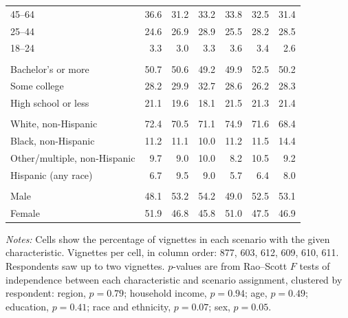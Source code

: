 \begin{table}[H]
\begin{threeparttable}
\begin{tabular}[t]{lrrrrrr}
\hspace{1em}45--64 & 36.6 & 31.2 & 33.2 & 33.8 & 32.5 & 31.4\\
\hspace{1em}25--44 & 24.6 & 26.9 & 28.9 & 25.5 & 28.2 & 28.5\\
\hspace{1em}18--24 & 3.3 & 3.0 & 3.3 & 3.6 & 3.4 & 2.6\\
\addlinespace[0.3em]
\multicolumn{7}{l}{\textit{Education}}\\
\hspace{1em}Bachelor's or more & 50.7 & 50.6 & 49.2 & 49.9 & 52.5 & 50.2\\
\hspace{1em}Some college & 28.2 & 29.9 & 32.7 & 28.6 & 26.2 & 28.3\\
\hspace{1em}High school or less & 21.1 & 19.6 & 18.1 & 21.5 & 21.3 & 21.4\\
\addlinespace[0.3em]
\multicolumn{7}{l}{\textit{Race and ethnicity}}\\
\hspace{1em}White{,} non-Hispanic & 72.4 & 70.5 & 71.1 & 74.9 & 71.6 & 68.4\\
\hspace{1em}Black{,} non-Hispanic & 11.2 & 11.1 & 10.0 & 11.2 & 11.5 & 14.4\\
\hspace{1em}Other/multiple{,} non-Hispanic & 9.7 & 9.0 & 10.0 & 8.2 & 10.5 & 9.2\\
\hspace{1em}Hispanic (any race) & 6.7 & 9.5 & 9.0 & 5.7 & 6.4 & 8.0\\
\addlinespace[0.3em]
\multicolumn{7}{l}{\textit{Sex}}\\
\hspace{1em}Male & 48.1 & 53.2 & 54.2 & 49.0 & 52.5 & 53.1\\
\hspace{1em}Female & 51.9 & 46.8 & 45.8 & 51.0 & 47.5 & 46.9\\
\bottomrule
\end{tabular}
\begin{tablenotes}[flushleft]
\footnotesize
\item \textit{Notes:} Cells show the percentage of vignettes in each scenario with the given characteristic. Vignettes per cell, in column order: 877, 603, 612, 609, 610, 611. Respondents saw up to two vignettes. $p$-values are from Rao--Scott $F$ tests of independence between each characteristic and scenario assignment, clustered by respondent: region, $p = 0.79$; household income, $p = 0.94$; age, $p = 0.49$; education, $p = 0.41$; race and ethnicity, $p = 0.07$; sex, $p = 0.05$.
\end{tablenotes}
\end{threeparttable}
\end{table}
